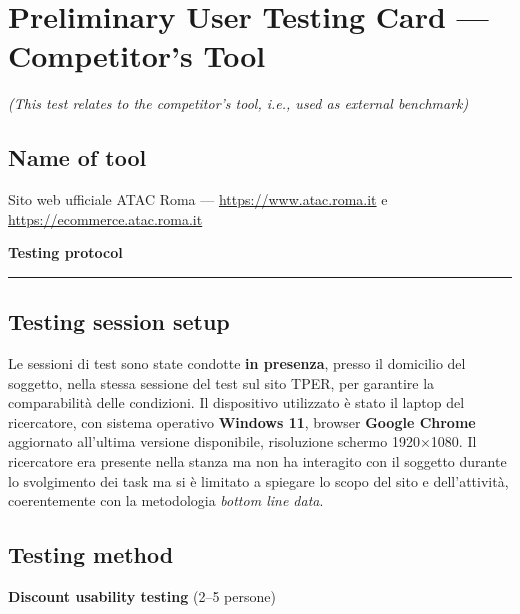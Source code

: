 ﻿\documentclass[11pt,a4paper]{article}
\begin{document}
\newpage

\section{Preliminary User Testing Card --- Competitor's Tool}
\textit{(This test relates to the competitor's tool, i.e., used as external benchmark)}
\vspace{0.2cm}

\subsection*{Name of tool}
\begin{tcolorbox}[base]
Sito web ufficiale ATAC Roma --- \url{https://www.atac.roma.it} e \url{https://ecommerce.atac.roma.it}
\end{tcolorbox}

\vspace{0.2cm}

\begin{center}
  {\color{secondaryColor}\large\bfseries Testing protocol}
  \vspace{0.1cm}
  \color{borderColor}\hrule
\end{center}

\vspace{0.2cm}

\subsection*{Testing session setup}
\begin{tcolorbox}[base]
Le sessioni di test sono state condotte \textbf{in presenza},
presso il domicilio del soggetto, nella stessa sessione del test sul sito TPER,
per garantire la comparabilità delle condizioni.
Il dispositivo utilizzato è stato il laptop del ricercatore,
con sistema operativo \textbf{Windows 11}, browser
\textbf{Google Chrome} aggiornato all'ultima versione
disponibile, risoluzione schermo 1920×1080. Il ricercatore
era presente nella stanza ma non ha interagito con il
soggetto durante lo svolgimento dei task  ma si è limitato a spiegare lo scopo del sito e dell'attività, coerentemente
con la metodologia \textit{bottom line data}.
\end{tcolorbox}

\vspace{0.2cm}

\subsection*{Testing method}
\textbf{Discount usability testing}
(2--5 persone)
\end{document}
